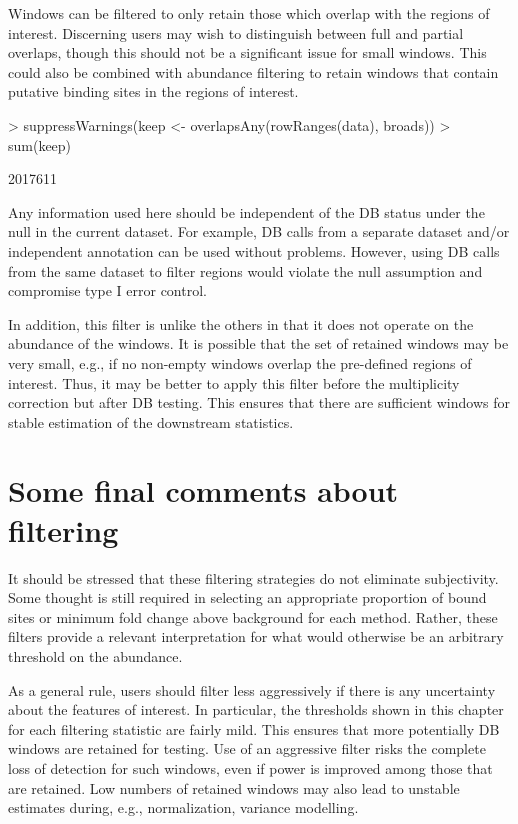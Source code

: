 \documentclass[12pt]{report}
\renewenvironment{Schunk}{\vspace{0pt}}{\vspace{0pt}}
\begin{document}
Windows can be filtered to only retain those which overlap with the regions of interest. 
Discerning users may wish to distinguish between full and partial overlaps, though this should not be a significant issue for small windows.
This could also be combined with abundance filtering to retain windows that contain putative binding sites in the regions of interest.

\begin{Schunk}
\begin{Sinput}
> suppressWarnings(keep <- overlapsAny(rowRanges(data), broads))
> sum(keep)
\end{Sinput}
\begin{Soutput}
[1] 2017611
\end{Soutput}
\end{Schunk}

Any information used here should be independent of the DB status under the null in the current dataset. 
For example, DB calls from a separate dataset and/or independent annotation can be used without problems. 
However, using DB calls from the same dataset to filter regions would violate the null assumption and compromise type I error control.

In addition, this filter is unlike the others in that it does not operate on the abundance of the windows. 
It is possible that the set of retained windows may be very small, e.g., if no non-empty windows overlap the pre-defined regions of interest.
Thus, it may be better to apply this filter before the multiplicity correction but after DB testing.
This ensures that there are sufficient windows for stable estimation of the downstream statistics.

\section{Some final comments about filtering}
It should be stressed that these filtering strategies do not eliminate subjectivity.
Some thought is still required in selecting an appropriate proportion of bound sites or minimum fold change above background for each method.
Rather, these filters provide a relevant interpretation for what would otherwise be an arbitrary threshold on the abundance.

As a general rule, users should filter less aggressively if there is any uncertainty about the features of interest.
In particular, the thresholds shown in this chapter for each filtering statistic are fairly mild.
This ensures that more potentially DB windows are retained for testing.
Use of an aggressive filter risks the complete loss of detection for such windows, even if power is improved among those that are retained.
Low numbers of retained windows may also lead to unstable estimates during, e.g., normalization, variance modelling.
\end{document}
